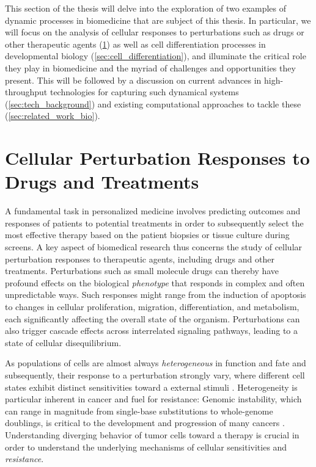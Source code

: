 This section of the thesis will delve into the exploration of two examples of dynamic processes in biomedicine that are subject of this thesis. 
In particular, we will focus on the analysis of cellular responses to perturbations such as drugs or other therapeutic agents (\cref{sec:cell_perturbation_responses}) as well as cell differentiation processes in developmental biology (\cref{sec:cell_differentiation}), and illuminate the critical role they play in biomedicine and the myriad of challenges and opportunities they present. 
This will be followed by a discussion on current advances in high-throughput technologies for capturing such dynamical systems (\cref{sec:tech_background}) and existing computational approaches to tackle these (\cref{sec:related_work_bio}).

\section{Cellular Perturbation Responses to Drugs and Treatments}
\label{sec:cell_perturbation_responses}

A fundamental task in personalized medicine involves predicting outcomes and responses of patients to potential treatments in order to subsequently select the most effective therapy based on the patient biopsies or tissue culture during screens.
A key aspect of biomedical research thus concerns the study of cellular perturbation responses to therapeutic agents, including drugs and other treatments. 
Perturbations such as small molecule drugs can thereby have profound effects on the biological \emph{phenotype} that responds in complex and often unpredictable ways.
Such responses might range from the induction of apoptosis to changes in cellular proliferation, migration, differentiation, and metabolism, each significantly affecting the overall state of the organism. 
Perturbations can also trigger cascade effects across interrelated signaling pathways, leading to a state of cellular disequilibrium.

As populations of cells are almost always \emph{heterogeneous} in function and fate and subsequently, their response to a perturbation strongly vary, where different cell states exhibit distinct sensitivities toward a external stimuli \citep{spiller2010measurement}.
Heterogeneity is particular inherent in cancer and fuel for resistance: Genomic instability, which can range in magnitude from single-base substitutions to whole-genome doublings, is critical to the development and progression of many cancers \citep{dagogo2018tumour}. Understanding diverging behavior of tumor cells toward a therapy is crucial in order to understand the underlying mechanisms of cellular sensitivities and \emph{resistance}.

